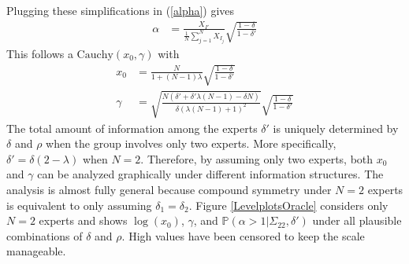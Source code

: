 \documentclass[11pt]{article}
\renewcommand{\P}{\mathbb{P}}
\theoremstyle{definition}
\theoremstyle{definition}
\begin{document}
Plugging these simplifications in (\ref{alpha}) gives 
\begin{align*}
\alpha &= \frac{X_{I'}}{\frac{1}{N}\sum_{j=1}^N X_{I_j}} \sqrt{\frac{1-\delta}{1-\delta'}} 
\end{align*}
This follows a $\text{Cauchy}(x_0, \gamma)$ with
\begin{align*}
x_0 &= \frac{N}{1+(N-1)\lambda}  \sqrt{\frac{1-\delta}{1-\delta'}}\\
 \gamma &=  \sqrt{\frac{N(\delta' + \delta' \lambda (N-1) - \delta N)}{\delta (\lambda (N-1) + 1)^2}}\sqrt{\frac{1-\delta}{1-\delta'}}
\end{align*}
The total amount of information among the experts $\delta'$ is uniquely determined by $\delta$ and $\rho$ when the group involves only two experts. More specifically, $\delta' = \delta(2 - \lambda)$ when $N=2$. Therefore, by assuming only two experts, both $x_0$ and $\gamma$ can be analyzed graphically under different information structures. The analysis is almost fully general because compound symmetry under $N = 2$ experts is equivalent to only assuming $\delta_1 = \delta_2$. Figure \ref{LevelplotsOracle} considers only $N=2$ experts and shows $\log(x_0)$, $\gamma$, and $\P(\alpha > 1 | \Sigma_{22}, \delta')$ under all plausible combinations of $\delta$ and $\rho$. High values have been censored to keep the scale manageable. 
\end{document}
